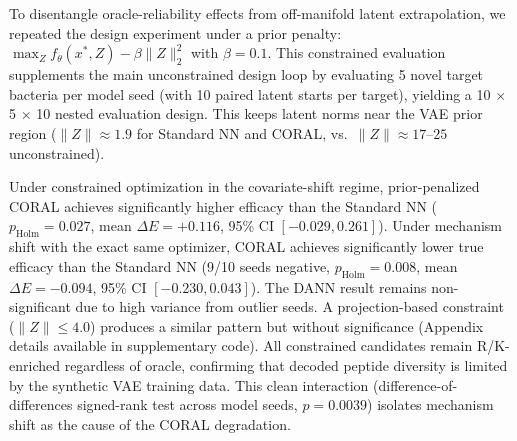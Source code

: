 \documentclass{article}
\begin{document}
To disentangle oracle-reliability effects from off-manifold latent extrapolation, we repeated the design experiment under a prior penalty: $\max_Z f_\theta(x^*, Z) - \beta\|Z\|_2^2$ with $\beta = 0.1$. This constrained evaluation supplements the main unconstrained design loop by evaluating 5 novel target bacteria per model seed (with 10 paired latent starts per target), yielding a 10 $\times$ 5 $\times$ 10 nested evaluation design. This keeps latent norms near the VAE prior region ($\|Z\| \approx 1.9$ for Standard NN and CORAL, vs.\ $\|Z\| \approx 17$--$25$ unconstrained).

\begin{table}[htbp]\footnotesize
\centering
\caption{Prior-penalized design-loop true SCM efficacy ($\beta = 0.1$) under covariate shift vs.\ mechanism shift (averaged across 5 targets per model seed). $\Delta \bar{E}$: paired difference vs.\ Standard NN (Holm-corrected for two comparisons per regime).}
\label{tab:constrained}
\end{table}

Under constrained optimization in the covariate-shift regime, prior-penalized CORAL achieves significantly higher efficacy than the Standard NN ($p_{\text{Holm}} = 0.027$, mean $\Delta E = +0.116$, 95\% CI $[-0.029, 0.261]$). Under mechanism shift with the exact same optimizer, CORAL achieves significantly lower true efficacy than the Standard NN (9/10 seeds negative, $p_{\text{Holm}} = 0.008$, mean $\Delta E = -0.094$, 95\% CI $[-0.230, 0.043]$). The DANN result remains non-significant due to high variance from outlier seeds. A projection-based constraint ($\|Z\| \leq 4.0$) produces a similar pattern but without significance (Appendix details available in supplementary code). All constrained candidates remain R/K-enriched regardless of oracle, confirming that decoded peptide diversity is limited by the synthetic VAE training data. This clean interaction (difference-of-differences signed-rank test across model seeds, $p = 0.0039$) isolates mechanism shift as the cause of the CORAL degradation.
\end{document}
